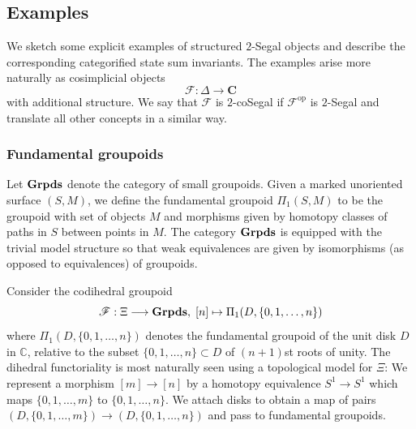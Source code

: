\documentclass[english,11pt,leqno]{article}
\def\CC{\mathbb{C}}
\def\scrF{\mathscr{F}}
\def\F{\scrF}
\def\Cb{\mathbf{C}}
\def\lra{\longrightarrow}
\def\op{{\operatorname{op}}}
\def\Groupoids{{\bf Grpds}}
\theoremstyle{definition}
\theoremstyle{remark}
\numberwithin{equation}{section}
\begin{document}
\subsection{Examples}

We sketch some explicit examples of structured $2$-Segal objects and describe the corresponding
categorified state sum invariants. The examples arise more naturally as cosimplicial objects
\[
	\F: \Delta \lra \Cb
\]
with additional structure. We say that $\F$ is $2$-coSegal if $\F^{\op}$ is $2$-Segal and translate
all other concepts in a similar way.

\subsubsection{Fundamental groupoids}
\label{sec:fundamental}

Let $\Groupoids$ denote the category of small groupoids. Given a marked unoriented surface $(S,M)$,
we define the fundamental groupoid $\Pi_1(S,M)$ to be the groupoid with set of objects $M$ and
morphisms given by homotopy classes of paths in $S$ between points in $M$. The category $\Groupoids$
is equipped with the trivial model structure so that weak equivalences are given by isomorphisms
(as opposed to equivalences) of groupoids.

Consider the codihedral groupoid
\[
	\F: \Xi \lra \Groupoids, \; [n] \mapsto \Pi_1(D, \{0,1,\dots,n\})
\]
where $\Pi_1(D,\{0,1,\dots,n\})$ denotes the fundamental groupoid of the unit disk $D$ in $\CC$, relative
to the subset $\{0,1,\dots,n\} \subset D$ of $(n+1)$st roots of unity. The dihedral functoriality is
most naturally seen using a topological model for $\Xi$: We represent a morphism $[m] \to [n]$ by a homotopy equivalence $S^1
\to S^1$ which maps $\{0,1,\dots,m\}$ to $\{0,1,\dots,n\}$. We attach disks to obtain a map of pairs
$(D,\{0,1,\dots,m\}) \to (D,\{0,1,\dots,n\})$ and pass to fundamental groupoids. 
\end{document}
